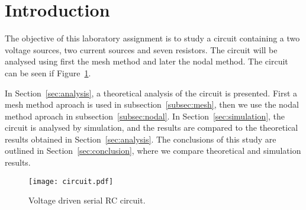 \section{Introduction}
\label{sec:introduction}

The objective of this laboratory assignment is to study a circuit containing a
two voltage sources, two current sources and seven resistors. The circuit
will be analysed using first the mesh method and later the nodal method.
The circuit can be seen if Figure~\ref{fig:circuit}.

In Section~\ref{sec:analysis}, a theoretical analysis of the circuit is
presented. First a mesh method aproach is used in subsection~\ref{subsec:mesh}, then we use the nodal method aproach in subsection~\ref{subsec:nodal}. In Section~\ref{sec:simulation}, the circuit is analysed by
simulation, and the results are compared to the theoretical results obtained in
Section~\ref{sec:analysis}. The conclusions of this study are outlined in
Section~\ref{sec:conclusion}, where we compare theoretical and simulation results.

\begin{figure}[H] \centering
\texttt{[image: circuit.pdf]}
\caption{Voltage driven serial RC circuit.}
\label{fig:circuit}
\end{figure}

